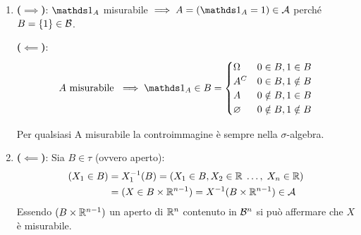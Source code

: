 \begin{dimo}
  \Fixvmode
  \begin{enumerate}
    \item \textbf{($\implies$)}:
    $\Ind_{A}$ misurabile $\implies A = (\Ind_A = 1) \in \Ac$ perché $B = \{1\} \in \mathcal B$.

      \textbf{($\impliedby$)}:
      $$
        A \text{ misurabile } \implies \Ind_A \in B =
          \begin{cases}
            \Omega    & 0 \in B,    1 \in B   \\
            A^C     & 0 \in B,    1 \notin B\\
            A       & 0 \notin B, 1 \in B   \\
            \varnothing   & 0 \notin B, 1 \notin B\\
          \end{cases}
      $$
      \begin{figure}[H]
        \centering
        \def\firstcircle{(-.1,-.1) circle (1.2cm)}
        \def\drect {(-1.5, -1.5) rectangle (1.5, 1.5)}
      \end{figure}

      Per qualsiasi A misurabile la controimmagine è sempre nella $\sigma$-algebra.
    \item \textbf{($\impliedby$)}: Sia $B \in \tau$ (ovvero aperto):
      \begin{align*}
        (X_1 \in B) &= X_1^{-1}(B) = (X_1 \in B, X_2 \in \mathbb R\; \dots, \;X_n \in \mathbb R)\\
        &= (X \in B \times \mathbb R^{n-1}) = X^{-1}(B \times \mathbb R^{n-1}) \in \mathcal A
      \end{align*}
      Essendo $(B \times \mathbb R^{n-1})$ un aperto di $\mathbb R^{n}$ contenuto in $ \mathcal B^n$ si può affermare che $X$ è misurabile.


\end{enumerate}
\end{dimo}

